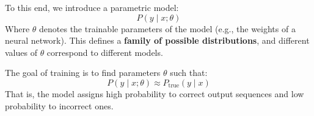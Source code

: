 \highspace
To this end, we introduce a parametric model:
\begin{equation*}
    P\left(y \mid x; \theta\right)
\end{equation*}
Where $\theta$ denotes the trainable parameters of the model (e.g., the weights of a neural network). This defines a \textbf{family of possible distributions}, and different values of $\theta$ correspond to different models.

\highspace
The goal of training is to find parameters $\theta$ such that:
\begin{equation*}
    P\left(y \mid x; \theta\right) \approx P_{\text{true}}\left(y \mid x\right)
\end{equation*}
That is, the model assigns high probability to correct output sequences and low probability to incorrect ones.